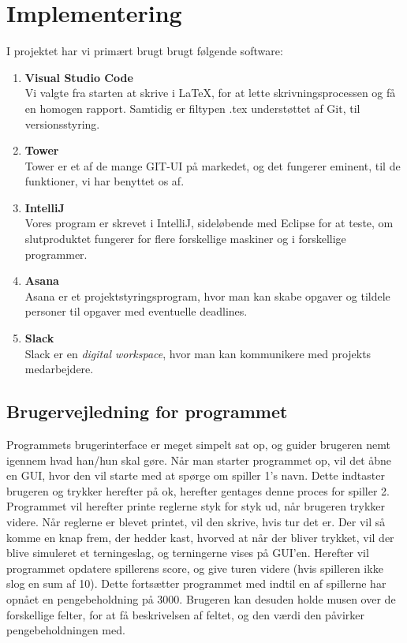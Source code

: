 \chapter{Implementering}
I projektet har vi primært brugt brugt følgende software:
\begin{enumerate}
    \item \textbf{Visual Studio Code}
    \\ Vi valgte fra starten at skrive i LaTeX, for at lette skrivningsprocessen og få en homogen rapport.
    Samtidig er filtypen .tex understøttet af Git, til versionsstyring.
    \item \textbf{Tower}
    \\Tower er et af de mange GIT-UI på markedet, og det fungerer eminent, til de funktioner, vi har benyttet os af.
    \item \textbf{IntelliJ}
    \\Vores program er skrevet i IntelliJ, sideløbende med Eclipse for at teste, om slutproduktet fungerer for flere forskellige maskiner og i forskellige programmer.
    \item \textbf{Asana}
    \\Asana er et projektstyringsprogram, hvor man kan skabe opgaver og tildele personer til opgaver med eventuelle deadlines.
    \item \textbf{Slack}
    \\Slack er en \textit{digital workspace}, hvor man kan kommunikere med projekts medarbejdere.
\end{enumerate}
\section{Brugervejledning for programmet}
Programmets brugerinterface er meget simpelt sat op, og guider brugeren nemt igennem hvad han/hun skal gøre.
Når man starter programmet op, vil det åbne en GUI, hvor den vil starte med at spørge om spiller 1's navn.
Dette indtaster brugeren og trykker herefter på ok, herefter gentages denne proces for spiller 2.
Programmet vil herefter printe reglerne styk for styk ud, når brugeren trykker videre.
Når reglerne er blevet printet, vil den skrive, hvis tur det er.
Der vil så komme en knap frem, der hedder kast, hvorved at når der bliver trykket, vil der blive simuleret et terningeslag, og terningerne vises på GUI'en.
Herefter vil programmet opdatere spillerens score, og give turen videre (hvis spilleren ikke slog en sum af 10).
Dette fortsætter programmet med indtil en af spillerne har opnået en pengebeholdning på 3000.
Brugeren kan desuden holde musen over de forskellige felter, for at få beskrivelsen af feltet, og den værdi den påvirker pengebeholdningen med.